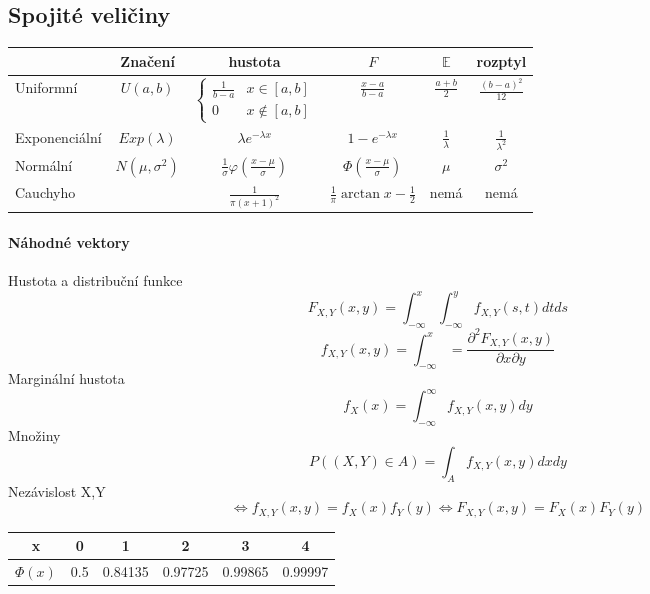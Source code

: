 \documentclass[10pt,a4paper]{article}
\theoremstyle{plain}
\theoremstyle{definition}
\begin{document}
\subsection{Spojité veličiny}

\begin{tabular}{| l | c | c | c | c | c | }
\hline
  & Značení & hustota & $F$ & $\mathbb{E}$ & rozptyl \\ 
 \hline
Uniformní & $U(a,b)$ & $\begin{cases} \frac1{b-a} & x \in [a,b] \\ 0 & x \notin [a,b] \end{cases}$ &  $\frac{x-a}{b-a}$ & $\frac{a+b}2$ & $\frac{(b-a)^2}{12}$ \\
 \hline
Exponenciální & $Exp(\lambda)$ & $\lambda e^{-\lambda x}$ &  $1 - e^{-\lambda x}$ & $\frac{1}{\lambda}$&  $\frac{1}{\lambda^2}$  \\
 \hline
Normální & $N(\mu, \sigma^2)$& $\frac{1}{\sigma}\varphi(\frac{x-\mu}{\sigma})$ & $\Phi(\frac{x-\mu}{\sigma})$  & $\mu$ & $\sigma^2$ \\
 \hline
 
 Cauchyho & & $\frac1{\pi(x+1)^2}$ & $\frac1\pi \arctan x - \frac12 $ & nemá &  nemá \\
 \hline
  
\end{tabular}

\paragraph{Náhodné vektory}

Hustota a distribuční funkce
\[ F_{X,Y}(x,y) = \int_{-\infty}^x  \int_{-\infty}^y  f_{X,Y} (s,t) dt ds\]
\[  f_{X,Y}(x,y)= \int_{-\infty}^x = \frac{\partial^2 F_{X,Y}(x,y)}{\partial x \partial y} \]
Marginální hustota
\[ f_X(x) = \int^\infty_{-\infty} f_{X,Y}(x,y)dy\]
Množiny
\[ P((X,Y) \in A) = \int_A f_{X,Y}(x,y) dx dy \]
Nezávislost X,Y
\[  \iff f_{X,Y}(x,y) = f_{X}(x) f_{Y}(y) \iff F_{X,Y}(x,y) = F_{X}(x) F_{Y}(y) \]

\renewcommand{\arraystretch}{0.8}


\begin{tabular}{| c | c | c | c | c | c |}
\hline
x & 0 & 1 & 2 & 3 & 4 \\
\hline
$\Phi(x)$ & 0.5 & 0.84135 & 0.97725 & 0.99865 & 0.99997 \\
\hline
\end{tabular}
\end{document}
